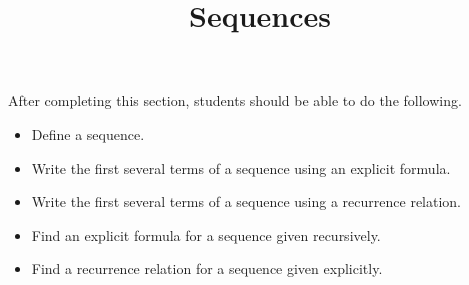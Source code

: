 \documentclass{ximera}
\title{Sequences}
\begin{document}
\begin{abstract}
\end{abstract}

\maketitle

\begin{sectionOutcomes}

After completing this section, students should be able to do the following.

\begin{itemize}
\item Define a sequence.
\item Write the first several terms of a sequence using an explicit formula.
\item Write the first several terms of a sequence using a recurrence
  relation.
\item Find an explicit formula for a sequence given recursively.
\item Find a recurrence relation for a sequence given explicitly.
\end{itemize}

\end{sectionOutcomes}
\end{document}
